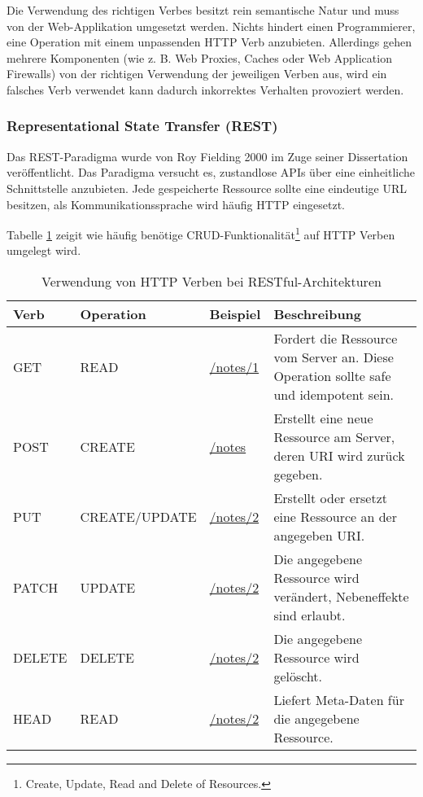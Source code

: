 Die Verwendung des richtigen Verbes besitzt rein semantische Natur und muss von der Web-Applikation umgesetzt werden. Nichts hindert einen Programmierer, eine Operation mit einem unpassenden HTTP Verb anzubieten. Allerdings gehen mehrere Komponenten (wie z. B. Web Proxies, Caches oder Web Application Firewalls) von der richtigen Verwendung der jeweiligen Verben aus, wird ein falsches Verb verwendet kann dadurch inkorrektes Verhalten provoziert werden.

\subsubsection{Representational State Transfer (REST)}

Das REST-Paradigma wurde von Roy Fielding 2000 im Zuge seiner Dissertation veröffentlicht. Das Paradigma versucht es, zustandlose APIs über eine einheitliche Schnittstelle anzubieten. Jede gespeicherte Ressource sollte eine eindeutige URL besitzen, als Kommunikationssprache wird häufig HTTP eingesetzt.

Tabelle \ref{tbl:rest} zeigit wie häufig benötige CRUD-Funktionalität\footnote{Create, Update, Read and Delete of Resources.} auf HTTP Verben umgelegt wird.

\begin{table}
	\begin{center}
\begin{tabular}{lllp{6cm}}
	\toprule
	Verb & Operation & Beispiel & Beschreibung \\
	\midrule
	GET  & READ & \url{/notes/1} & Fordert die Ressource vom Server an. Diese Operation sollte safe und idempotent sein. \\
	POST & CREATE & \url{/notes} &  Erstellt eine neue Ressource am Server, deren URI wird zurück gegeben.\\
	PUT  & CREATE/UPDATE & \url{/notes/2} & Erstellt oder ersetzt eine Ressource an der angegeben URI.\\
	PATCH & UPDATE & \url{/notes/2} & Die angegebene Ressource wird verändert, Nebeneffekte sind erlaubt. \\
	DELETE & DELETE & \url{/notes/2} & Die angegebene Ressource wird gelöscht. \\
	HEAD & READ & \url{/notes/2} & Liefert Meta-Daten für die angegebene Ressource. \\
	\bottomrule
\end{tabular}
	\caption{Verwendung von HTTP Verben bei RESTful-Architekturen}
	\label{tbl:rest}
\end{center}
\end{table}

